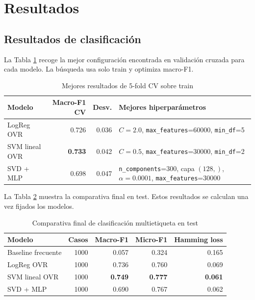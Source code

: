 \documentclass[11pt,a4paper]{article}
\begin{document}
\section{Resultados}
\label{sec_resultados}

\subsection{Resultados de clasificación}

La Tabla \ref{tab_cv} recoge la mejor configuración encontrada en validación cruzada para cada modelo. La búsqueda usa solo train y optimiza macro-F1.

\begin{table}[H]
\centering
\caption{Mejores resultados de 5-fold CV sobre train}
\label{tab_cv}
\small
\begin{tabular}{@{}lrrp{}@{}}
\toprule
\textbf{Modelo} & \textbf{Macro-F1 CV} & \textbf{Desv.} & \textbf{Mejores hiperparámetros}\\
\midrule
LogReg OVR & 0.726 & 0.036 & \(C=2.0\), \texttt{max\_features}=60000, \texttt{min\_df}=5\\
\rowcolor{bestrow} SVM lineal OVR & \textbf{0.733} & 0.042 & \(C=0.5\), \texttt{max\_features}=30000, \texttt{min\_df}=2\\
SVD + MLP & 0.698 & 0.047 & \texttt{n\_components}=300, capa \((128,)\), \(\alpha=0.0001\), \texttt{max\_features}=30000\\
\bottomrule
\end{tabular}
\end{table}

La Tabla \ref{tab_clasificacion} muestra la comparativa final en test. Estos resultados se calculan una vez fijados los modelos.

\begin{table}[H]
\centering
\caption{Comparativa final de clasificación multietiqueta en test}
\label{tab_clasificacion}
\small
\begin{tabular}{@{}lrrrr@{}}
\toprule
\textbf{Modelo} & \textbf{Casos} & \textbf{Macro-F1} & \textbf{Micro-F1} & \textbf{Hamming loss}\\
\midrule
Baseline frecuente & 1000 & 0.057 & 0.324 & 0.165\\
LogReg OVR & 1000 & 0.736 & 0.760 & 0.069\\
\rowcolor{bestrow} SVM lineal OVR & 1000 & \textbf{0.749} & \textbf{0.777} & \textbf{0.061}\\
SVD + MLP & 1000 & 0.690 & 0.767 & 0.062\\
\bottomrule
\end{tabular}
\end{table}
\end{document}
